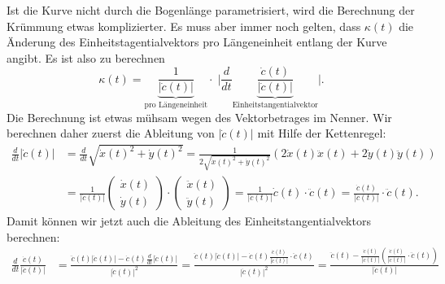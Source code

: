 Ist die Kurve nicht durch die Bogenlänge parametrisiert, wird die
Berechnung der Krümmung etwas komplizierter.
Es muss aber immer noch gelten, dass $\kappa(t)$ die Änderung des
Einheitstagentialvektors pro Längeneinheit entlang der Kurve angibt.
Es ist also zu berechnen
\begin{equation}
\kappa(t)
=
\underbrace{\frac{1}{|\dot c(t)|}}_{\text{pro Längeneinheit}}
\cdot\;
\biggl|\frac{d}{dt}\underbrace{\frac{\dot c(t)}{|\dot c(t)|}}_{\text{Einheitstangentialvektor}}\biggr|.
\label{skript:kruemmung:krallg2}
\end{equation}
Die Berechnung ist etwas mühsam wegen des Vektorbetrages im Nenner.
Wir berechnen daher zuerst die Ableitung von $|\dot c(t)|$ mit
Hilfe der Kettenregel:
\begin{align*}
\frac{d}{dt}|\dot c(t)|
&=
\frac{d}{dt}\sqrt{\dot x(t)^2+\dot y(t)^2}
=
\frac1{2\sqrt{\dot x(t)^2 + \dot y(t)^2}}(2\dot x(t)\ddot x(t) + 2\dot y(t)\ddot y(t))
\\
&=
\frac{1}{|\dot c(t)|}
\begin{pmatrix}\dot x(t)\\\dot y(t)\end{pmatrix}
\cdot
\begin{pmatrix}\ddot x(t)\\\ddot y(t)\end{pmatrix}
=
\frac{1}{|\dot c(t)|}
\dot c(t)\cdot\ddot c(t)
=
\frac{\dot c(t)}{|\dot c(t)|} \cdot\ddot c(t).
\end{align*}
Damit können wir jetzt auch die Ableitung des Einheitstangentialvektors
berechnen:
\begin{align}
\frac{d}{dt} \frac{\dot c(t)}{|\dot c(t)|}
&=
\frac{\displaystyle\ddot c(t) |\dot c(t)| - \dot c(t) \frac{d}{dt}|\dot c(t)|}{|\dot c(t)|^2}
=
\frac{\displaystyle\ddot c(t) |\dot c(t)| - \dot c(t) \frac{\dot c(t)}{|\dot c(t)|}\cdot \ddot c(t)}{|\dot c(t)|^2}
=
\frac{\displaystyle\ddot c(t) - \frac{\dot c(t)}{|\dot c(t)|} \left( \frac{\dot c(t)}{|\dot c(t)|}\cdot \ddot c(t)\right)}{|\dot c(t)|}
\label{skript:kruemmung:krallg1}
\end{align}
